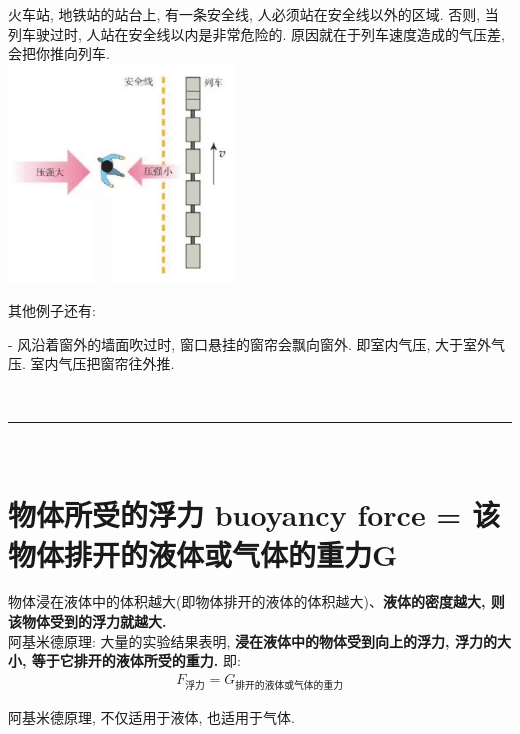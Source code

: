 \documentclass[UTF8]{ctexart}
\begin{document}
	\begin{tcolorbox}[title = {例},boxrule={0.1em},colframe={black!10}, colback={black!3},colbacktitle={black!10},coltitle={black}]
	火车站, 地铁站的站台上, 有一条安全线, 人必须站在安全线以外的区域. 否则, 当列车驶过时, 人站在安全线以内是非常危险的. 原因就在于列车速度造成的气压差, 会把你推向列车. \\
	
	\includegraphics[width=0.45\textwidth]{img/0042.png} 
	\end{tcolorbox}


其他例子还有: 

- 风沿着窗外的墙面吹过时, 窗口悬挂的窗帘会飘向窗外. 即室内气压, 大于室外气压. 室内气压把窗帘往外推.


~\\
\hrule
~\\



\section{物体所受的浮力 buoyancy force = 该物体排开的液体或气体的重力G}

物体浸在液体中的体积越大(即物体排开的液体的体积越大)、\textbf{液体的密度越大, 则该物体受到的浮力就越大.} \\

阿基米德原理: 大量的实验结果表明, \textbf{浸在液体中的物体受到向上的浮力, 浮力的大小, 等于它排开的液体所受的重力.} 即:
\begin{align*}
	\boxed{
	F_{\text{浮力}}=G_{\text{排开的液体或气体的重力}}	
	}
\end{align*}

阿基米德原理, 不仅适用于液体, 也适用于气体.
\end{document}
